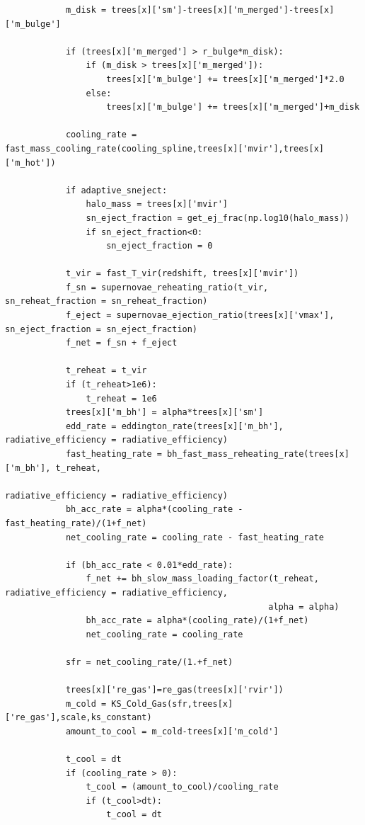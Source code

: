 \documentclass[onecolumn]{aastex62}
\begin{document}
\begin{verbatim}
            m_disk = trees[x]['sm']-trees[x]['m_merged']-trees[x]['m_bulge']

            if (trees[x]['m_merged'] > r_bulge*m_disk):            
                if (m_disk > trees[x]['m_merged']):
                    trees[x]['m_bulge'] += trees[x]['m_merged']*2.0
                else:
                    trees[x]['m_bulge'] += trees[x]['m_merged']+m_disk

            cooling_rate = fast_mass_cooling_rate(cooling_spline,trees[x]['mvir'],trees[x]['m_hot'])
            
            if adaptive_sneject:
                halo_mass = trees[x]['mvir']
                sn_eject_fraction = get_ej_frac(np.log10(halo_mass))
                if sn_eject_fraction<0:
                    sn_eject_fraction = 0

            t_vir = fast_T_vir(redshift, trees[x]['mvir'])
            f_sn = supernovae_reheating_ratio(t_vir, sn_reheat_fraction = sn_reheat_fraction)
            f_eject = supernovae_ejection_ratio(trees[x]['vmax'], sn_eject_fraction = sn_eject_fraction)
            f_net = f_sn + f_eject

            t_reheat = t_vir
            if (t_reheat>1e6):
                t_reheat = 1e6
            trees[x]['m_bh'] = alpha*trees[x]['sm']
            edd_rate = eddington_rate(trees[x]['m_bh'], radiative_efficiency = radiative_efficiency)
            fast_heating_rate = bh_fast_mass_reheating_rate(trees[x]['m_bh'], t_reheat, 
                                                            radiative_efficiency = radiative_efficiency)
            bh_acc_rate = alpha*(cooling_rate - fast_heating_rate)/(1+f_net)
            net_cooling_rate = cooling_rate - fast_heating_rate

            if (bh_acc_rate < 0.01*edd_rate):
                f_net += bh_slow_mass_loading_factor(t_reheat, radiative_efficiency = radiative_efficiency,
                                                    alpha = alpha)
                bh_acc_rate = alpha*(cooling_rate)/(1+f_net)
                net_cooling_rate = cooling_rate

            sfr = net_cooling_rate/(1.+f_net)

            trees[x]['re_gas']=re_gas(trees[x]['rvir'])
            m_cold = KS_Cold_Gas(sfr,trees[x]['re_gas'],scale,ks_constant) 
            amount_to_cool = m_cold-trees[x]['m_cold']

            t_cool = dt 
            if (cooling_rate > 0):
                t_cool = (amount_to_cool)/cooling_rate
                if (t_cool>dt):
                    t_cool = dt


\end{verbatim}
\end{document}
